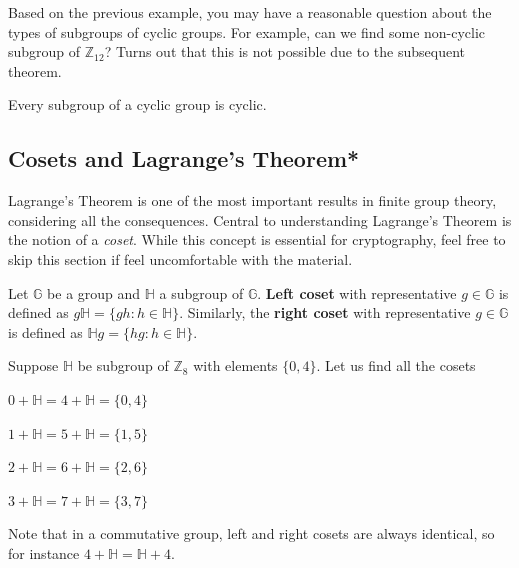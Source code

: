 \documentclass[../../book.tex]{subfiles}
\begin{document}
Based on the previous example, you may have a reasonable question about the types of subgroups 
of cyclic groups. For example, can we find some non-cyclic subgroup of $\mathbb{Z}_{12}$? Turns 
out that this is not possible due to the subsequent theorem.

\begin{theorem}
    Every subgroup of a cyclic group is cyclic.
\end{theorem}

\subsection{Cosets and Lagrange's Theorem*}
 
Lagrange's Theorem is one of the most important
results in finite group theory, considering all the consequences. Central to
understanding Lagrange's Theorem is the notion of a \textit{coset}. While 
this concept is essential for cryptography, feel free to skip this section if feel 
uncomfortable with the material.

\begin{definition}
    Let $\mathbb{G}$ be a group and $\mathbb{H}$ a subgroup of $\mathbb{G}$.
    \textbf{Left coset} with representative $g \in \mathbb{G}$ is defined as
    $g\mathbb{H} = \{gh : h \in \mathbb{H}\}$. Similarly, the \textbf{right
    coset} with representative $g \in \mathbb{G}$ is defined as $\mathbb{H}g =
    \{hg : h \in \mathbb{H}\}$.
\end{definition}

\begin{example}
    Suppose $\mathbb{H}$ be subgroup of $\mathbb{Z}_{8}$ with elements $\{0, 4\}$. 
    Let us find all the cosets
    \begin{center} %
        \vspace{-8mm}
        \item $0 + \mathbb{H} = 4 + \mathbb{H} = \{0, 4\}$
        \item $1 + \mathbb{H} = 5 + \mathbb{H} = \{1, 5\}$
        \item $2 + \mathbb{H} = 6 + \mathbb{H} = \{2, 6\}$
        \item $3 + \mathbb{H} = 7 + \mathbb{H} = \{3, 7\}$
    \end{center}
\end{example}

Note that in a commutative group, left and right cosets are always identical, so for instance $4+\mathbb{H}=\mathbb{H}+4$.
\end{document}
